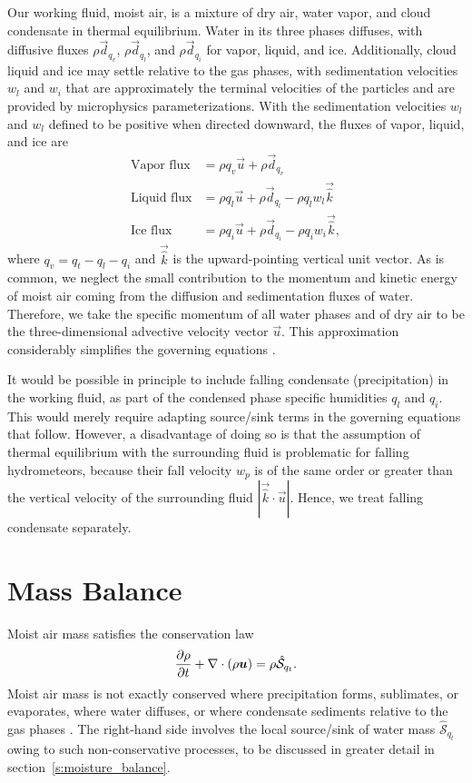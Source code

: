 \documentclass{report}
\begin{document}
Our working fluid, moist air, is a mixture of dry air, water vapor, and cloud condensate in thermal equilibrium. Water in its three phases diffuses, with diffusive fluxes $\rho \vec{d}_{q_v}$, $\rho \vec{d}_{q_l}$, and $\rho \vec{d}_{q_i}$ for vapor, liquid, and ice. Additionally, cloud liquid and ice may settle relative to the gas phases, with sedimentation velocities $w_l$ and $w_i$ that are approximately the terminal velocities of the particles and are provided by microphysics parameterizations. With the sedimentation velocities $w_l$ and $w_l$ defined to be positive when directed downward, the fluxes of vapor, liquid, and ice are
\begin{subequations}
\begin{align}
    \text{Vapor flux}  &= \rho q_v \vec{u}  + \rho \vec{d}_{q_v}\\
    \text{Liquid flux}  &= \rho q_l \vec{u}  + \rho \vec{d}_{q_l} - \rho q_l w_l  \vec{\hat k}\\
    \text{Ice flux} &= \rho q_i \vec{u} + \rho \vec{d}_{q_i} - \rho q_i w_i  \vec{\hat k},
\end{align}
\end{subequations}
where $q_v = q_t - q_l - q_i$ and $\vec{\hat k}$ is the upward-pointing vertical unit vector. As is common, we neglect the small contribution to the momentum and kinetic energy of moist air coming from the diffusion and sedimentation fluxes of water. Therefore, we take the specific momentum of all water phases and of dry air to be the three-dimensional advective velocity vector $\vec{u}$. This approximation considerably simplifies the governing equations \citep{Romps08a}.

It would be possible in principle to include falling condensate (precipitation) in the working fluid, as part of the condensed phase specific humidities $q_l$ and $q_i$. This would merely require adapting source/sink terms in the governing equations that follow. However, a disadvantage of doing so is that the assumption of thermal equilibrium with the surrounding fluid is problematic for falling hydrometeors, because their fall velocity $w_{p}$ is of the same order or greater than the vertical velocity of the surrounding fluid $|\vec{\hat k} \cdot \vec{u}|$. Hence, we treat falling condensate separately.

\section{Mass Balance}

Moist air mass satisfies the conservation law
\begin{equation}
\frac{\partial \rho}{\partial t} + \nabla \cdot (\rho\boldsymbol{{u}}) = \rho \mathcal{\hat S}_{q_t}.
\label{e:governing_equations/mass}
\end{equation}
Moist air mass is not exactly conserved where precipitation forms, sublimates, or evaporates, where water diffuses, or where condensate sediments relative to the gas phases \citep{Bott08a, Romps08a}. The  right-hand side involves the local source/sink of water mass $\mathcal{\hat S}_{q_t}$ owing to such non-conservative processes, to be discussed in greater detail in section~\ref{s:moisture_balance}.
\end{document}
